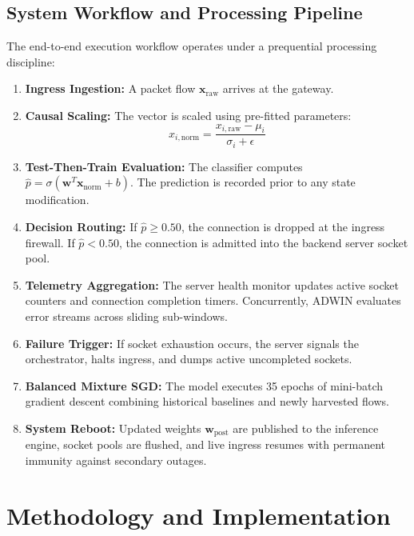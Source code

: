 \documentclass[12pt,a4paper,oneside]{report}
\begin{document}
\section{System Workflow and Processing Pipeline}
The end-to-end execution workflow operates under a prequential processing discipline:
\begin{enumerate}
    \item \textbf{Ingress Ingestion:} A packet flow $\mathbf{x}_{\text{raw}}$ arrives at the gateway.
    \item \textbf{Causal Scaling:} The vector is scaled using pre-fitted parameters:
    \begin{equation}
    x_{i,\text{norm}} = \frac{x_{i,\text{raw}} - \mu_i}{\sigma_i + \epsilon}
    \end{equation}
    \item \textbf{Test-Then-Train Evaluation:} The classifier computes $\hat{p} = \sigma(\mathbf{w}^T \mathbf{x}_{\text{norm}} + b)$. The prediction is recorded prior to any state modification.
    \item \textbf{Decision Routing:} If $\hat{p} \ge 0.50$, the connection is dropped at the ingress firewall. If $\hat{p} < 0.50$, the connection is admitted into the backend server socket pool.
    \item \textbf{Telemetry Aggregation:} The server health monitor updates active socket counters and connection completion timers. Concurrently, ADWIN evaluates error streams across sliding sub-windows.
    \item \textbf{Failure Trigger:} If socket exhaustion occurs, the server signals the orchestrator, halts ingress, and dumps active uncompleted sockets.
    \item \textbf{Balanced Mixture SGD:} The model executes 35 epochs of mini-batch gradient descent combining historical baselines and newly harvested flows.
    \item \textbf{System Reboot:} Updated weights $\mathbf{w}_{\text{post}}$ are published to the inference engine, socket pools are flushed, and live ingress resumes with permanent immunity against secondary outages.
\end{enumerate}


\chapter{Methodology and Implementation}
\label{chap:implementation}
\end{document}
